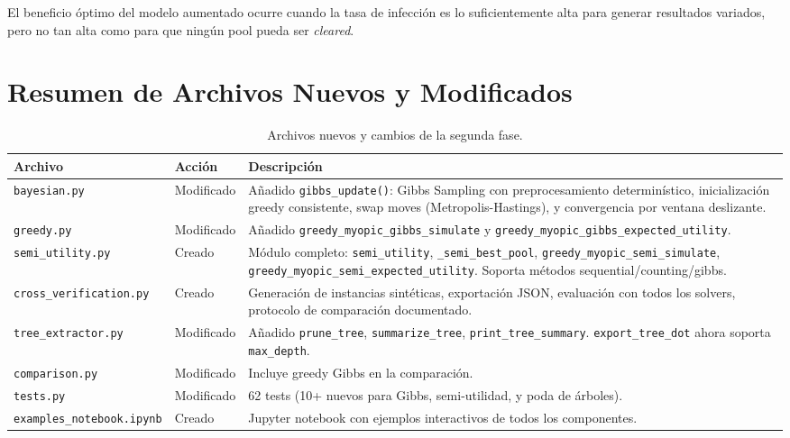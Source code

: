 \documentclass[11pt, a4paper]{article}
\begin{document}
El beneficio \'optimo del modelo aumentado ocurre cuando la tasa de
infecci\'on es lo suficientemente alta para generar resultados variados,
pero no tan alta como para que ning\'un pool pueda ser \textit{cleared}.

\section{Resumen de Archivos Nuevos y Modificados}

\begin{table}[htbp]
\centering
\caption{Archivos nuevos y cambios de la segunda fase.}
\begin{tabular}{llp{6.5cm}}
\toprule
\textbf{Archivo} & \textbf{Acci\'on} & \textbf{Descripci\'on} \\
\midrule
\texttt{bayesian.py} & Modificado & A\~nadido \texttt{gibbs\_update()}:
Gibbs Sampling con preprocesamiento determin\'istico, inicializaci\'on
greedy consistente, swap moves (Metropolis-Hastings), y convergencia
por ventana deslizante. \\
\texttt{greedy.py} & Modificado & A\~nadido
\texttt{greedy\_myopic\_gibbs\_simulate} y
\texttt{greedy\_myopic\_gibbs\_expected\_utility}. \\
\texttt{semi\_utility.py} & Creado & M\'odulo completo: \texttt{semi\_utility},
\texttt{\_semi\_best\_pool},
\texttt{greedy\_myopic\_semi\_simulate},
\texttt{greedy\_myopic\_semi\_expected\_utility}.
Soporta m\'etodos sequential/counting/gibbs. \\
\texttt{cross\_verification.py} & Creado & Generaci\'on de instancias
sint\'eticas, exportaci\'on JSON, evaluaci\'on con todos los solvers,
protocolo de comparaci\'on documentado. \\
\texttt{tree\_extractor.py} & Modificado & A\~nadido \texttt{prune\_tree},
\texttt{summarize\_tree}, \texttt{print\_tree\_summary}.
\texttt{export\_tree\_dot} ahora soporta \texttt{max\_depth}. \\
\texttt{comparison.py} & Modificado & Incluye greedy Gibbs en la
comparaci\'on. \\
\texttt{tests.py} & Modificado & 62 tests (10+ nuevos para Gibbs,
semi-utilidad, y poda de \'arboles). \\
\texttt{examples\_notebook.ipynb} & Creado & Jupyter notebook con
ejemplos interactivos de todos los componentes. \\
\bottomrule
\end{tabular}
\end{table}
\end{document}
